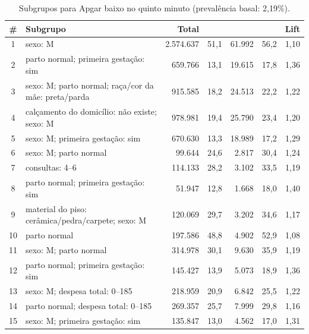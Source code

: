 \begin{table}[H]
\centering
\caption{Subgrupos para Apgar baixo no quinto minuto (prevalência basal: 2,19\%).}
\label{tab:apgar}

\scriptsize
\setlength{\tabcolsep}{4pt}
\renewcommand{\arraystretch}{1.04}

\begin{tabularx}{\textwidth}{@{}c Y r r r r r@{}}
\toprule
\textbf{\#} & \textbf{Subgrupo} & \textbf{Total} & \textbf{} & \textbf{} & \textbf{} & \textbf{Lift} \\
\midrule
{}
1 & sexo: M & 2.574.637 & 51,1 & 61.992 & 56,2 & 1,10 \\
2 & parto normal; primeira gestação: sim & 659.766 & 13,1 & 19.615 & 17,8 & 1,36 \\
3 & sexo: M; parto normal; raça/cor da mãe: preta/parda & 915.585 & 18,2 & 24.513 & 22,2 & 1,22 \\
4 & calçamento do domicílio: não existe; sexo: M & 978.981 & 19,4 & 25.790 & 23,4 & 1,20 \\
5 & sexo: M; primeira gestação: sim & 670.630 & 13,3 & 18.989 & 17,2 & 1,29 \\

6 & sexo: M; parto normal & 99.644 & 24,6 & 2.817 & 30,4 & 1,24 \\
7 & consultas: 4--6 & 114.133 & 28,2 & 3.102 & 33,5 & 1,19 \\
8 & parto normal; primeira gestação: sim & 51.947 & 12,8 & 1.668 & 18,0 & 1,40 \\
9 & material do piso: cerâmica/pedra/carpete; sexo: M & 120.069 & 29,7 & 3.202 & 34,6 & 1,17 \\
10 & parto normal & 197.586 & 48,8 & 4.902 & 52,9 & 1,08 \\

11 & sexo: M; parto normal & 314.978 & 30,1 & 9.630 & 35,9 & 1,19 \\
12 & parto normal; primeira gestação: sim & 145.427 & 13,9 & 5.073 & 18,9 & 1,36 \\
13 & sexo: M; despesa total: 0--185 & 218.959 & 20,9 & 6.842 & 25,5 & 1,22 \\
14 & parto normal; despesa total: 0--185 & 269.357 & 25,7 & 7.999 & 29,8 & 1,16 \\
15 & sexo: M; primeira gestação: sim & 135.847 & 13,0 & 4.562 & 17,0 & 1,31 \\


\end{tabularx}
\end{table}
